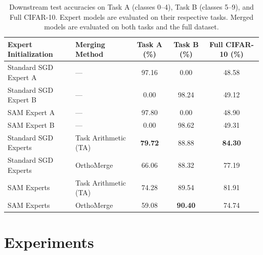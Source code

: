 \documentclass{article}
\begin{document}
\begin{table}[t]
\vspace{-5pt}
\caption{Downstream test accuracies on Task A (classes 0--4), Task B (classes 5--9), and Full CIFAR-10. Expert models are evaluated on their respective tasks. Merged models are evaluated on both tasks and the full dataset.}
\label{tab:results}
\centering
\begin{tabular}{llccc}
\toprule
\textbf{Expert Initialization} & \textbf{Merging Method} & \textbf{Task A (\%)} & \textbf{Task B (\%)} & \textbf{Full CIFAR-10 (\%)} \\
\midrule
Standard SGD Expert A & — & 97.16 & 0.00 & 48.58 \\
Standard SGD Expert B & — & 0.00 & 98.24 & 49.12 \\
SAM Expert A          & — & 97.80 & 0.00 & 48.90 \\
SAM Expert B          & — & 0.00 & 98.62 & 49.31 \\
\midrule
Standard SGD Experts  & Task Arithmetic (TA) & \textbf{79.72} & 88.88 & \textbf{84.30} \\
Standard SGD Experts  & OrthoMerge          & 66.06 & 88.32 & 77.19 \\
\midrule
SAM Experts           & Task Arithmetic (TA) & 74.28 & 89.54 & 81.91 \\
SAM Experts           & OrthoMerge          & 59.08 & \textbf{90.40} & 74.74 \\
\bottomrule
\end{tabular}
\vspace{-10pt}
\end{table}
\vspace{-10pt}

\section{Experiments}
\label{sec:experiments}
\end{document}
